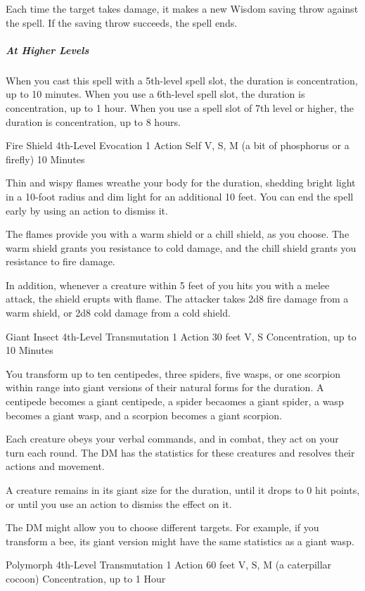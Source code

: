 {Each time the target takes damage, it makes a new Wisdom saving throw against the spell. If the saving throw succeeds, the spell ends.

\subparagraph*{At Higher Levels} When you cast this spell with a 5th-level spell slot, the duration is concentration, up to 10 minutes. When you use a 6th-level spell slot, the duration is concentration, up to 1 hour. When you use a spell slot of 7th level or higher, the duration is concentration, up to 8 hours.

\DndSpellHeader
  {Fire Shield}
  {4th-Level Evocation}
  {1 Action}
  {Self}
  {V, S, M (a bit of phosphorus or a firefly)}
  {10 Minutes}

Thin and wispy flames wreathe your body for the duration, shedding bright light in a 10-foot radius and dim light for an additional 10 feet. You can end the spell early by using an action to dismiss it.

The flames provide you with a warm shield or a chill shield, as you choose. The warm shield grants you resistance to cold damage, and the chill shield grants you resistance to fire damage.

In addition, whenever a creature within 5 feet of you hits you with a melee attack, the shield erupts with flame. The attacker takes 2d8 fire damage from a warm shield, or 2d8 cold damage from a cold shield.

\DndSpellHeader
  {Giant Insect}
  {4th-Level Transmutation}
  {1 Action}
  {30 feet}
  {V, S}
  {Concentration, up to 10 Minutes}

You transform up to ten centipedes, three spiders, five wasps, or one scorpion within range into giant versions of their natural forms for the duration. A centipede becomes a giant centipede, a spider becaomes a giant spider, a wasp becomes a giant wasp, and a scorpion becomes a giant scorpion.

Each creature obeys your verbal commands, and in combat, they act on your turn each round. The DM has the statistics for these creatures and resolves their actions and movement.

A creature remains in its giant size for the duration, until it drops to 0 hit points, or until you use an action to dismiss the effect on it.

The DM might allow you to choose different targets. For example, if you transform a bee, its giant version might have the same statistics as a giant wasp.

\DndSpellHeader
  {Polymorph}
  {4th-Level Transmutation}
  {1 Action}
  {60 feet}
  {V, S, M (a caterpillar cocoon)}
  {Concentration, up to 1 Hour}

}
